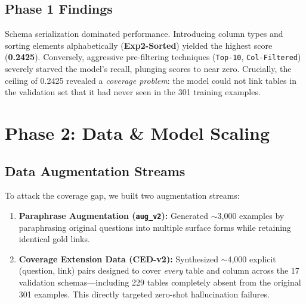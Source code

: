 \documentclass[10pt,twocolumn]{article}
\begin{document}
\begin{table}[h]
\centering
\caption{Selected Round 1 Results (Original 301 examples). Sorted by Leaderboard Score.}
\label{tab:r1}
\end{table}

\subsection{Phase 1 Findings}
Schema serialization dominated performance. Introducing column types and sorting elements alphabetically (\textbf{Exp2-Sorted}) yielded the highest score (\textbf{0.2425}). Conversely, aggressive pre-filtering techniques (\texttt{Top-10}, \texttt{Col-Filtered}) severely starved the model's recall, plunging scores to near zero. Crucially, the ceiling of 0.2425 revealed a \emph{coverage problem}: the model could not link tables in the validation set that it had never seen in the 301 training examples.

\section{Phase 2: Data \& Model Scaling}
\label{sec:phase2}

\subsection{Data Augmentation Streams}
To attack the coverage gap, we built two augmentation streams:
\begin{enumerate}
  \item \textbf{Paraphrase Augmentation (\texttt{aug\_v2}):} Generated $\sim$3,000 examples by paraphrasing original questions into multiple surface forms while retaining identical gold links.
  \item \textbf{Coverage Extension Data (CED-v2):} Synthesized $\sim$4,000 explicit (question, link) pairs designed to cover \emph{every} table and column across the 17 validation schemas—including 229 tables completely absent from the original 301 examples. This directly targeted zero-shot hallucination failures.
\end{enumerate}
\end{document}
